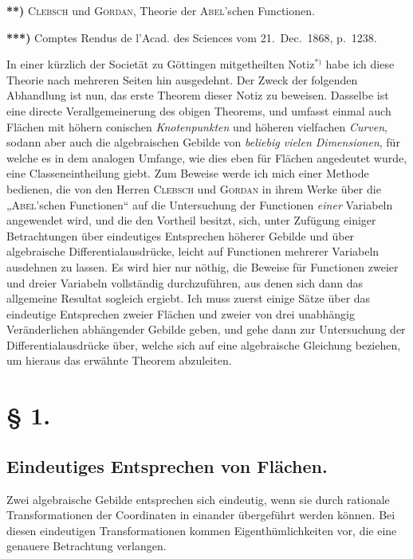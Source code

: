 \documentclass{article}
\begin{document}
\textbf{**)} \textsc{Clebsch} und \textsc{Gordan}, Theorie der \textsc{Abel}'schen Functionen.

\textbf{***)} Comptes Rendus de l'Acad. des Sciences vom 21.~Dec.~1868, p.~1238.

In einer kürzlich der Societät zu Göttingen mitgetheilten Notiz${}^{*)}$ habe ich diese Theorie nach mehreren Seiten hin ausgedehnt. Der Zweck der folgenden Abhandlung ist nun, das erste Theorem dieser Notiz zu beweisen. Dasselbe ist eine directe Verallgemeinerung des obigen Theorems, und umfasst einmal auch Flächen mit höhern conischen \emph{Knotenpunkten} und höheren vielfachen \emph{Curven}, sodann aber auch die algebraischen Gebilde von \emph{beliebig vielen Dimensionen}, für welche es in dem analogen Umfange, wie dies eben für Flächen angedeutet wurde, eine Classeneintheilung giebt. Zum Beweise werde ich mich einer Methode bedienen, die von den Herren \textsc{Clebsch} und \textsc{Gordan} in ihrem Werke über die „\textsc{Abel}'schen Functionen“ auf die Untersuchung der Functionen \emph{einer} Variabeln angewendet wird, und die den Vortheil besitzt, sich, unter Zufügung einiger Betrachtungen über eindeutiges Entsprechen höherer Gebilde und über algebraische Differentialausdrücke, leicht auf Functionen mehrerer Variabeln ausdehnen zu lassen. Es wird hier nur nöthig, die Beweise für Functionen zweier und dreier Variabeln vollständig durchzuführen, aus denen sich dann das allgemeine Resultat sogleich ergiebt. Ich muss zuerst einige Sätze über das eindeutige Entsprechen zweier Flächen und zweier von drei unabhängig Veränderlichen abhängender Gebilde geben, und gehe dann zur Untersuchung der Differentialausdrücke über, welche sich auf eine algebraische Gleichung beziehen, um hieraus das erwähnte Theorem abzuleiten.

\section*{§ 1.}

\subsection*{Eindeutiges Entsprechen von Flächen.}

Zwei algebraische Gebilde entsprechen sich eindeutig, wenn sie durch rationale Transformationen der Coordinaten in einander übergeführt werden können. Bei diesen eindeutigen Transformationen kommen Eigenthümlichkeiten vor, die eine genauere Betrachtung verlangen.
\end{document}

